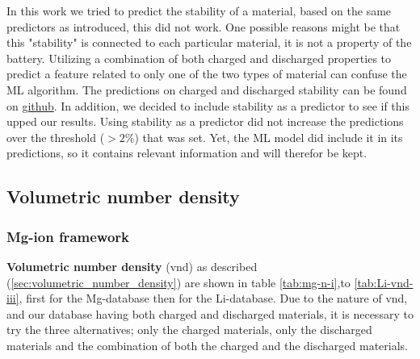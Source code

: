 In this work we tried to predict the stability of a material, based on the same predictors as introduced, this did not work. One possible reasons might be that this "stability" is connected to each particular material, it is not a property of the battery. Utilizing a combination of both charged and discharged properties to predict a feature related to only one of the two types of material can confuse the ML algorithm. The predictions on charged and discharged stability can be found on \href{https://github.com/sondrt/Machine-Learning-the-Voltage-Capacity-and-Energy-density-of-Electrode-Materials}{github}. In addition, we decided to include stability as a predictor to see if this upped our results. Using stability as a predictor did not increase the predictions over the threshold ($>2\%$) that was set. Yet, the ML model did include it in its predictions, so it contains relevant information and will therefor be kept.  
 


\FloatBarrier
\subsection{Volumetric number density}
\subsubsection*{Mg-ion framework}

\textbf{Volumetric number density} (vnd) as described (\ref{sec:volumetric_number_density}) are shown in table \ref{tab:mg-n-i},to \ref{tab:Li-vnd-iii}, first for the Mg-database then for the Li-database. Due to the nature of vnd, and our database having both charged and discharged materials, it is necessary to try the three alternatives; only the charged materials, only the discharged materials and the combination of both the charged and the discharged materials.

